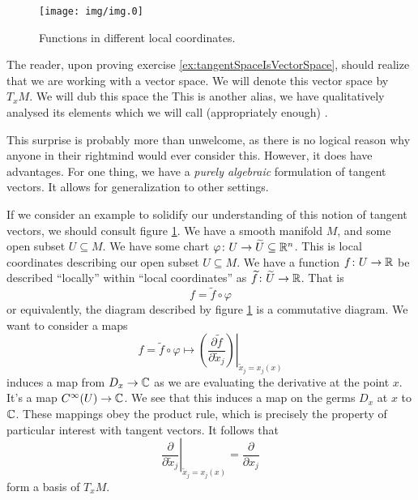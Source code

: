 \medbreak

\begin{figure}[t]
\begin{center}
\texttt{[image: img/img.0]}
\end{center}
\caption{Functions in different local coordinates.}\label{fig:img0}
\end{figure}

The reader, upon proving exercise
\ref{ex:tangentSpaceIsVectorSpace}, should realize that we are
working with a vector space. We will denote this vector space by
$T_{x}M$. We will dub
this space the  This is
another alias, we have qualitatively analysed its elements which
we will call (appropriately enough) .

This surprise is probably more than unwelcome, as there is no
logical reason why anyone in their rightmind would ever consider
this. However, it does have advantages. For one thing, we have a
\emph{purely algebraic} formulation of tangent vectors. It allows
for generalization to other settings.

If we consider an example to solidify our understanding of this
notion of tangent vectors, we should consult figure \ref{fig:img0}.
We have a smooth manifold $M$, and some open subset $U\subseteq
M$. We have some chart $\varphi\colon U\to \widetilde{U}\subseteq\Bbb{R}^{n}$.
This is local coordinates describing our open subset $U\subseteq M$.
We have a function $f\colon U\to\Bbb{R}$ be described ``locally''
within ``local coordinates'' as
$\widetilde{f}\colon\widetilde{U}\to\Bbb{R}$. That is
\begin{equation}
f = \widetilde{f}\circ\varphi
\end{equation}
or equivalently, the diagram described by figure \ref{fig:img0}
is a commutative diagram. We want to consider a maps
\begin{equation}
f=\widetilde{f}\circ\varphi\mapsto\left.\left(\frac{\partial\widetilde{f}}{\partial\widetilde{x}_{j}}\right)\right|_{\widetilde{x}_{j}=x_{j}(x)}
\end{equation}
induces a map from $D_{x}\to\Bbb{C}$ as we are evaluating the
derivative at the point $x$. It's a map $\diff(U)\to\Bbb{C}$. We
see that this induces a map on the germs $D_{x}$ at $x$ to
$\Bbb{C}$. These mappings obey the product rule, which is
precisely the property of particular interest with tangent
vectors. It follows that
\begin{equation}
\left.\frac{\partial}{\partial\widetilde{x}_{j}}\right|_{\widetilde{x}_{j}=x_{j}(x)}
=\frac{\partial}{\partial x_{j}}
\end{equation}
form a basis of $T_{x}M$.

